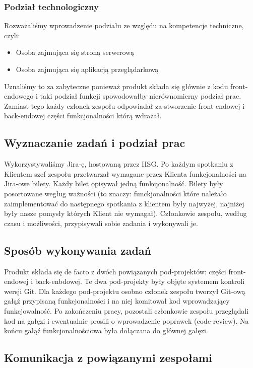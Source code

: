 \documentclass[polish,12pt]{aghthesis}
\begin{document}
\subsubsection{Podział technologiczny}
Rozważaliśmy wprowadzenie podziału ze względu na kompetencje techniczne, czyli:
\begin{itemize}
    \item Osoba zajmująca się stroną serwerową
    \item Osoba zajmująca się aplikacją przeglądarkową
\end{itemize}
Uznaliśmy to za zabyteczne ponieważ produkt składa się głównie z kodu front-endowego i taki podział funkcji spowodowałby nierównomierny podział prac. Zamiast tego każdy członek zespołu odpowiadał za stworzenie front-endowej i back-endowej części funkcjonalności którą wdrażał.

\subsection{Wyznaczanie zadań i podział prac}
Wykorzystywaliśmy Jira-ę, hostowaną przez IISG. Po każdym spotkaniu z Klientem szef zespołu przetwarzał wymagane przez Klienta funkcjonalności na Jira-owe bilety. Każdy bilet opisywał jedną funkcjonalność. Bilety były posortowane wegług ważności (to znaczy: funckjonalności które należało zaimplementować do następnego spotkania z klientem były najwyżej, najniżej były nasze pomysły których Klient nie wymagał). Członkowie zespołu, według czasu i możliwości, przypisywali sobie zadania i wykonywali je.

\subsection{Sposób wykonywania zadań}
Produkt składa się de facto z dwóch powiązanych pod-projektów: części front-endowej i back-enbdowej. Te dwa pod-projekty były objęte systemem kontroli wersji Git. Dla każdego pod-projektu osobno członek zespołu tworzył Git-ową gałąź przypisaną funkcjonalności i na niej komitował kod wprowadzający funkcjowalność. Po zakończeniu pracy, pozostali członkowie zespołu przeglądali kod na gałęzi i ewentualnie prosili o wprowadzenie poprawek (code-review). Na końcu gałąź funkcjonalnościowa była dołączana do głównej gałęzi.

\subsection{Komunikacja z powiązanymi zespołami}
\end{document}
